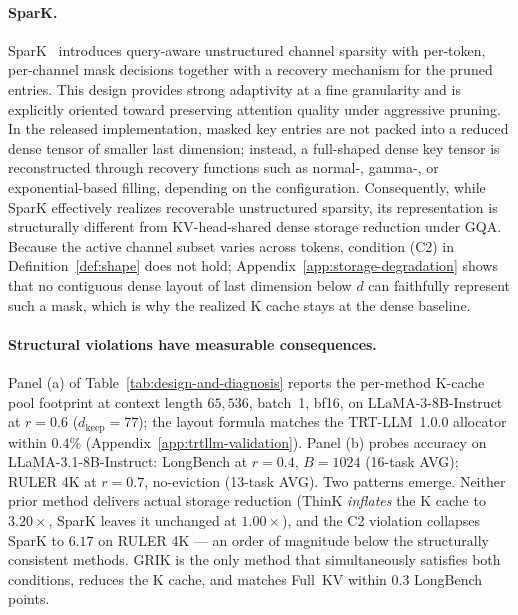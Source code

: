 \documentclass{article}
\begin{document}
\paragraph{SparK.} SparK~\citep{spark} introduces query-aware unstructured channel sparsity with per-token, per-channel mask decisions together with a recovery mechanism for the pruned entries. This design provides strong adaptivity at a fine granularity and is explicitly oriented toward preserving attention quality under aggressive pruning. In the released implementation, masked key entries are not packed into a reduced dense tensor of smaller last dimension; instead, a full-shaped dense key tensor is reconstructed through recovery functions such as normal-, gamma-, or exponential-based filling, depending on the configuration. Consequently, while SparK effectively realizes recoverable unstructured sparsity, its representation is structurally different from KV-head-shared dense storage reduction under GQA. Because the active channel subset varies across tokens, condition (C2) in Definition~\ref{def:shape} does not hold; Appendix~\ref{app:storage-degradation} shows that no contiguous dense layout of last dimension below $d$ can faithfully represent such a mask, which is why the realized K cache stays at the dense baseline.
 

 
\paragraph{Structural violations have measurable consequences.} Panel (a) of Table~\ref{tab:design-and-diagnosis} reports the per-method K-cache pool footprint at context length $65{,}536$, batch~1, bf16, on LLaMA-3-8B-Instruct at $r{=}0.6$ ($d_{\text{keep}}{=}77$); the layout formula matches the TRT-LLM~1.0.0 allocator within $0.4\%$ (Appendix~\ref{app:trtllm-validation}). Panel (b) probes accuracy on LLaMA-3.1-8B-Instruct: LongBench at $r{=}0.4$, $B{=}1024$ (16-task AVG); RULER 4K at $r{=}0.7$, no-eviction (13-task AVG). Two patterns emerge. Neither prior method delivers actual storage reduction (ThinK \emph{inflates} the K cache to $3.20\times$, SparK leaves it unchanged at $1.00\times$), and the C2 violation collapses SparK to $6.17$ on RULER 4K --- an order of magnitude below the structurally consistent methods. GRIK is the only method that simultaneously satisfies both conditions, reduces the K cache, and matches Full~KV within $0.3$ LongBench points.
 
\end{document}

